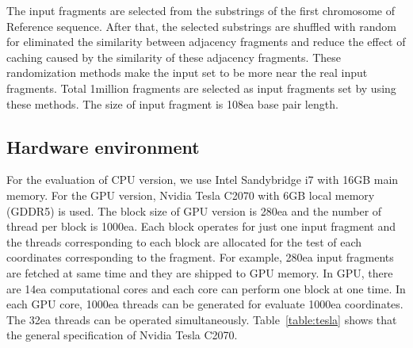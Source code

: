 The input fragments are selected from the substrings of the first chromosome of
Reference sequence. After that, the selected substrings are shuffled with
random for eliminated the similarity between adjacency fragments and reduce the
effect of caching caused by the similarity of these adjacency fragments. These
randomization methods make the input set to be more near the real input
fragments. Total 1million fragments are selected as input fragments set by
using these methods. The size of input fragment is 108ea base pair length.\\

\subsection{Hardware environment} \label{sec:method_hw}

For the evaluation of CPU version, we use Intel Sandybridge i7 with 16GB main
memory. For the GPU version, Nvidia Tesla C2070 with 6GB local memory (GDDR5)
is used. The block size of GPU version is 280ea and the number of thread per
block is 1000ea. Each block operates for just one input fragment and the
threads corresponding to each block are allocated for the test of each
coordinates corresponding to the fragment. For example, 280ea input fragments
are fetched at same time and they are shipped to GPU memory. In GPU, there are
14ea computational cores and each core can perform one block at one time. In
each GPU core, 1000ea threads can be generated for evaluate 1000ea coordinates.
The 32ea threads can be operated simultaneously. Table~\ref{table:tesla} shows
that the general specification of Nvidia Tesla C2070.\\

